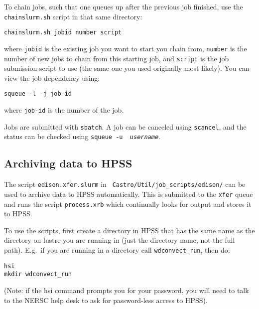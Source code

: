 To chain jobs, such that one queues up after the previous job finished,         
use the {\tt chainslurm.sh} script in that same directory:
\begin{verbatim}
chainslurm.sh jobid number script
\end{verbatim}
where {\tt jobid} is the existing job you want to start you chain
from, {\tt number} is the number of new jobs to chain from this
starting job, and {\tt script} is the job submission script to use
(the same one you used originally most likely).  You can view the job
dependency using:
\begin{verbatim}                                                                
squeue -l -j job-id                                                             
\end{verbatim}                                                                  
where {\tt job-id} is the number of the job.                                    
                                                                                
Jobs are submitted with {\tt sbatch}.  A job can be canceled using              
{\tt scancel}, and the status can be checked using {\tt squeue -u {\em          
username}}.                                                                     


\subsection{Archiving data to HPSS}

The script {\tt edison.xfer.slurm} in {\tt
  Castro/Util/job\_scripts/edison/} can be used to archive data to
HPSS automatically.  This is submitted to the {\tt xfer} queue and
runs the script {\tt process.xrb} which continually looks for output
and stores it to HPSS.

To use the scripts, first create a directory in HPSS that has the same          
name as the directory on lustre you are running in (just the directory          
name, not the full path).  E.g.\ if you are running in a directory              
call {\tt wdconvect\_run}, then do:                                             
\begin{verbatim}                                                                
hsi                                                                             
mkdir wdconvect_run                                                             
\end{verbatim}                                                                  
(Note: if the hsi command prompts you for your password, you will need          
to talk to the NERSC help desk to ask for password-less access to                
HPSS).                                                                          
                                                                                
